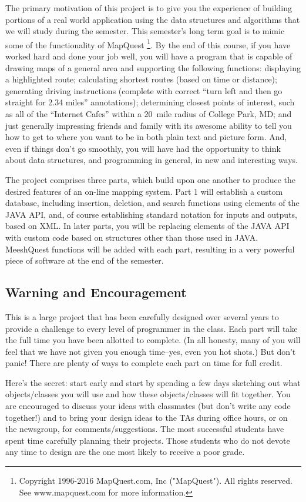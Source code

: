\documentclass[12pt]{article}
\begin{document}
The primary motivation of this project is to give you 
the experience of building portions of a real world application using
 the data
structures and algorithms that we will study during the semester.
This semester's long term goal
is to mimic some of the functionality of MapQuest \footnote{Copyright
1996-2016 MapQuest.com, Inc ("MapQuest"). All rights reserved. See
www.mapquest.com for more information.}. By the end of this course, if 
you have worked hard and done your job well,  you will
have a program that is capable of drawing maps
of a general area and supporting the following functions:
displaying a highlighted route;
 calculating shortest routes (based on time or 
distance);
 generating driving instructions (complete with correct ``turn left and then go straight
for 2.34 miles'' annotations); determining closest points of interest,
 such as all of the ``Internet Cafes'' within a 20~mile radius of College
 Park, MD;
 and just generally impressing friends and family with its
awesome ability to tell you how to get to where you want to be in both
plain text and picture form.
And, even if things don't go smoothly, you will have had the opportunity to
 think about data structures, and programming in general, in new and
interesting ways.


The project comprises three  parts,  which build upon one another to produce
the desired features of an on-line mapping system. Part 1 will
establish a custom database, including insertion, deletion, and search
functions using elements of the JAVA API, and, of course establishing
standard notation for inputs and outputs, based on XML.
In later parts, 
you will be replacing elements of the JAVA API with
custom code based on structures other  than those
used in JAVA. MeeshQuest functions will be added with each
part, resulting in a very powerful piece of software at the end of the semester.


\subsection{Warning and Encouragement}
This is a large project that has been carefully designed over several years
to provide a challenge to every level of programmer in the class. Each part
will take the full time you have been allotted to complete. (In all honesty,
many of you will feel that we have not given you enough time--yes, even
you hot shots.) But don't panic! There are plenty of ways to complete each
part on time for full credit.

Here's the secret: start early and start by spending a few days sketching
out what objects/classes you will use and how these objects/classes will
fit together. You are encouraged to discuss your ideas with classmates (but
don't write any code together!) and to bring your design ideas to the TAs
during office hours, or on the newsgroup,
for comments/suggestions. The most successful students have spent time
carefully planning their projects. Those students who do not devote any
time to design are the one most likely to receive a poor grade.
\end{document}
